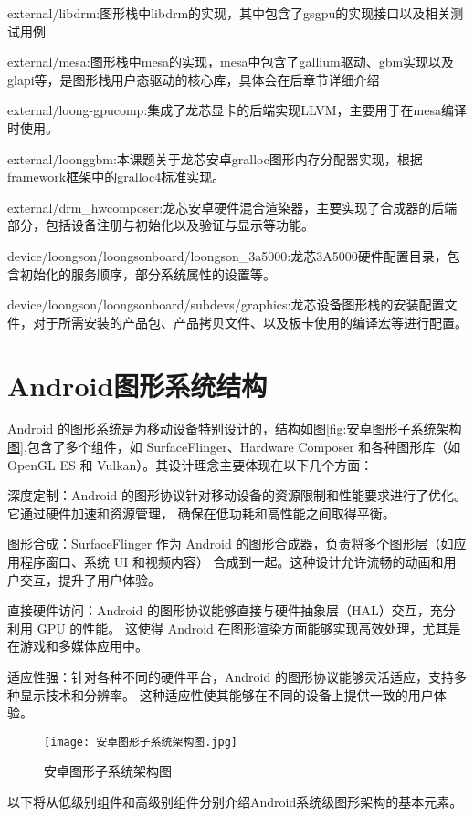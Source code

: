   external/libdrm:图形栈中libdrm的实现，其中包含了gsgpu的实现接口以及相关测试用例

  external/mesa:图形栈中mesa的实现，mesa中包含了gallium驱动、gbm实现以及glapi等，是图形栈用户态驱动的核心库，具体会在后章节详细介绍

  external/loong-gpucomp:集成了龙芯显卡的后端实现LLVM，主要用于在mesa编译时使用。

  external/loonggbm:本课题关于龙芯安卓gralloc图形内存分配器实现，根据framework框架中的gralloc4标准实现。

  external/drm\_hwcomposer:龙芯安卓硬件混合渲染器，主要实现了合成器的后端部分，包括设备注册与初始化以及验证与显示等功能。

  device/loongson/loongsonboard/loongson\_3a5000:龙芯3A5000硬件配置目录，包含初始化的服务顺序，部分系统属性的设置等。

  device/loongson/loongsonboard/subdevs/graphics:龙芯设备图形栈的安装配置文件，对于所需安装的产品包、产品拷贝文件、以及板卡使用的编译宏等进行配置。

\section{Android图形系统结构}
\label{sec:Android图形系统结构}
Android 的图形系统是为移动设备特别设计的，结构如图\ref{fig:安卓图形子系统架构图},包含了多个组件，如 SurfaceFlinger、Hardware Composer 
和各种图形库（如 OpenGL ES 和 Vulkan）。其设计理念主要体现在以下几个方面：

深度定制：Android 的图形协议针对移动设备的资源限制和性能要求进行了优化。它通过硬件加速和资源管理，
确保在低功耗和高性能之间取得平衡。

图形合成：SurfaceFlinger 作为 Android 的图形合成器，负责将多个图形层（如应用程序窗口、系统 UI 和视频内容）
合成到一起。这种设计允许流畅的动画和用户交互，提升了用户体验。

直接硬件访问：Android 的图形协议能够直接与硬件抽象层（HAL）交互，充分利用 GPU 的性能。
这使得 Android 在图形渲染方面能够实现高效处理，尤其是在游戏和多媒体应用中。

适应性强：针对各种不同的硬件平台，Android 的图形协议能够灵活适应，支持多种显示技术和分辨率。
这种适应性使其能够在不同的设备上提供一致的用户体验。

\begin{figure}[h]
  \centering
  \texttt{[image: 安卓图形子系统架构图.jpg]}
  \caption{安卓图形子系统架构图}
\end{figure}

以下将从低级别组件和高级别组件分别介绍Android系统级图形架构的基本元素。

